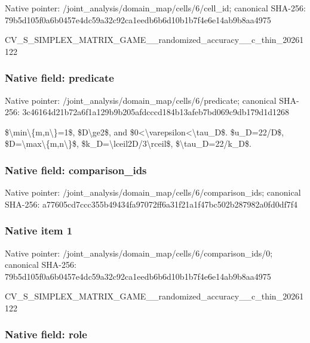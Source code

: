 \documentclass[10pt,a4paper]{article}
\begin{document}
Native pointer: /joint\_analysis/domain\_m\allowbreak{}ap/cells/6/cell\_id; canonical SHA-256: 79b5d105f0a6b0457e4dc59a\allowbreak{}32c92ca1eedb6b6d10b1b7f4\allowbreak{}e6e14ab9b8aa4975


CV\_S\_SIMPLEX\_MATRIX\_GAME\allowbreak{}\_\_randomized\_accuracy\_\_c\allowbreak{}\_thin\_20261122


\subsubsection{Native field: predicate}


Native pointer: /joint\_analysis/domain\_m\allowbreak{}ap/cells/6/predicate; canonical SHA-256: 3c46164d21b72a6f1a129b9b\allowbreak{}205afdcccd184b13afeb7bd0\allowbreak{}69c9db179d1d1268


\$\textbackslash{}min\textbackslash{}\{m,n\textbackslash{}\}=1\$, \$D\textbackslash{}ge2\$, and \$0<\textbackslash{}varepsilon<\textbackslash{}tau\_D\$. \$u\_D=22/D\$, \$D=\textbackslash{}max\textbackslash{}\{m,n\textbackslash{}\}\$, \$k\_D=\textbackslash{}lceil2D/3\textbackslash{}rceil\$, \$\textbackslash{}tau\_D=22/k\_D\$.


\subsubsection{Native field: comparison\_ids}


Native pointer: /joint\_analysis/domain\_m\allowbreak{}ap/cells/6/comparison\_id\allowbreak{}s; canonical SHA-256: a77605cd7ccc355b49434fa9\allowbreak{}7072ff6a31f21a1f47bc502b\allowbreak{}287982a0fd0df7f4



\subsubsection{Native item 1}


Native pointer: /joint\_analysis/domain\_m\allowbreak{}ap/cells/6/comparison\_id\allowbreak{}s/0; canonical SHA-256: 79b5d105f0a6b0457e4dc59a\allowbreak{}32c92ca1eedb6b6d10b1b7f4\allowbreak{}e6e14ab9b8aa4975


CV\_S\_SIMPLEX\_MATRIX\_GAME\allowbreak{}\_\_randomized\_accuracy\_\_c\allowbreak{}\_thin\_20261122


\subsubsection{Native field: role}
\end{document}

